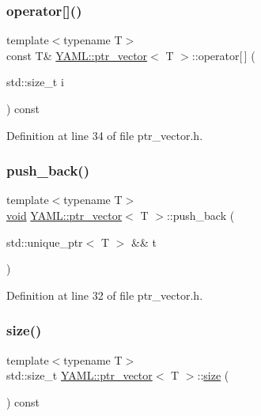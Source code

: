 \subsubsection{\texorpdfstring{operator[]()}{operator[]()}\hspace{0.1cm}{\footnotesize\ttfamily [2/2]}}
{\footnotesize\ttfamily template$<$typename T$>$ \\
const T\& \mbox{\hyperlink{class_y_a_m_l_1_1ptr__vector}{Y\+A\+M\+L\+::ptr\+\_\+vector}}$<$ T $>$\+::operator\mbox{[}$\,$\mbox{]} (\begin{DoxyParamCaption}\item[{std\+::size\+\_\+t}]{i }\end{DoxyParamCaption}) const\hspace{0.3cm}{\ttfamily [inline]}}



Definition at line 34 of file ptr\+\_\+vector.\+h.

\mbox{\label{class_y_a_m_l_1_1ptr__vector_a45d56913599355615236efdb7a1b7f56}} 
\subsubsection{\texorpdfstring{push\_back()}{push\_back()}}
{\footnotesize\ttfamily template$<$typename T$>$ \\
\mbox{\hyperlink{glad_8h_a950fc91edb4504f62f1c577bf4727c29}{void}} \mbox{\hyperlink{class_y_a_m_l_1_1ptr__vector}{Y\+A\+M\+L\+::ptr\+\_\+vector}}$<$ T $>$\+::push\+\_\+back (\begin{DoxyParamCaption}\item[{std\+::unique\+\_\+ptr$<$ T $>$ \&\&}]{t }\end{DoxyParamCaption})\hspace{0.3cm}{\ttfamily [inline]}}



Definition at line 32 of file ptr\+\_\+vector.\+h.

\mbox{\label{class_y_a_m_l_1_1ptr__vector_a4e3ff811626d9436a768db19bfc515eb}} 
\subsubsection{\texorpdfstring{size()}{size()}}
{\footnotesize\ttfamily template$<$typename T$>$ \\
std\+::size\+\_\+t \mbox{\hyperlink{class_y_a_m_l_1_1ptr__vector}{Y\+A\+M\+L\+::ptr\+\_\+vector}}$<$ T $>$\+::\mbox{\hyperlink{glad_8h_a79ef9eb3e59c4bb34c4b9fbeb8d28ff7}{size}} (\begin{DoxyParamCaption}{ }\end{DoxyParamCaption}) const\hspace{0.3cm}{\ttfamily [inline]}}



